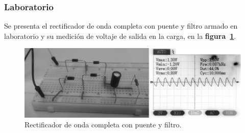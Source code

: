 \subsubsection{Laboratorio}
Se presenta el rectificador de onda completa con puente y filtro armado en
laboratorio y su medición de voltaje de salida en la carga, en la
\textbf{figura~\ref{laboratorio09}}.

\begin{figure}[!h]
\centering
\includegraphics[scale=0.28]{fotos/07.onda_completa2.eps}
\caption{Rectificador de onda completa con puente y filtro.}
\label{laboratorio09}
\end{figure}

